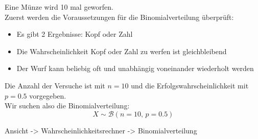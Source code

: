 \begin{bsp}
    Eine Münze wird 10 mal geworfen. \\
    Zuerst werden die Voraussetzungen für die Binomialverteilung überprüft:
    \begin{itemize}
        \item Es gibt 2 Ergebnisse: Kopf oder Zahl
        \item Die Wahrscheinlichkeit Kopf oder Zahl zu werfen ist gleichbleibend
        \item Der Wurf kann beliebig oft und unabhängig voneinander wiederholt werden
    \end{itemize}

    Die Anzahl der Versuche ist mit $n=10$ und die Erfolgswahrscheinlichkeit mit $p=0.5$ vorgegeben. \\
    Wir suchen also die Binomialverteilung:
    \[
        X \sim \mathcal{B}(n=10,\, p=0.5) 
    \]
    \begin{geogebracode}
        Ansicht -> Wahrscheinlichkeitsrechner -> Binomialverteilung
    \end{geogebracode}

\end{bsp}
